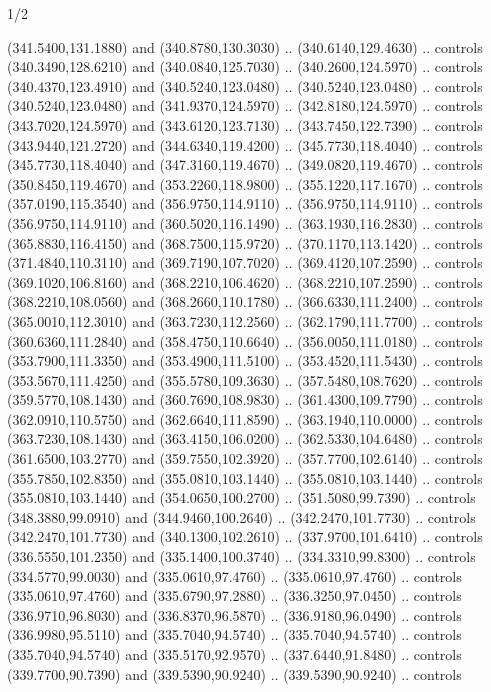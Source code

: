 \begin{flagdescription}{1/2}
\begin{scope}[xshift=0.5\flaglength]
\begin{scope}[scale=0.004\flagwidth,xshift=-90mm,yshift=89mm]
\begin{scope}[y=0.80pt, x=0.80pt, yscale=-1, xscale=1, inner sep=0pt, outer sep=0pt]
  (341.5400,131.1880) and (340.8780,130.3030) .. (340.6140,129.4630) .. controls
  (340.3490,128.6210) and (340.0840,125.7030) .. (340.2600,124.5970) .. controls
  (340.4370,123.4910) and (340.5240,123.0480) .. (340.5240,123.0480) .. controls
  (340.5240,123.0480) and (341.9370,124.5970) .. (342.8180,124.5970) .. controls
  (343.7020,124.5970) and (343.6120,123.7130) .. (343.7450,122.7390) .. controls
  (343.9440,121.2720) and (344.6340,119.4200) .. (345.7730,118.4040) .. controls
  (345.7730,118.4040) and (347.3160,119.4670) .. (349.0820,119.4670) .. controls
  (350.8450,119.4670) and (353.2260,118.9800) .. (355.1220,117.1670) .. controls
  (357.0190,115.3540) and (356.9750,114.9110) .. (356.9750,114.9110) .. controls
  (356.9750,114.9110) and (360.5020,116.1490) .. (363.1930,116.2830) .. controls
  (365.8830,116.4150) and (368.7500,115.9720) .. (370.1170,113.1420) .. controls
  (371.4840,110.3110) and (369.7190,107.7020) .. (369.4120,107.2590) .. controls
  (369.1020,106.8160) and (368.2210,106.4620) .. (368.2210,107.2590) .. controls
  (368.2210,108.0560) and (368.2660,110.1780) .. (366.6330,111.2400) .. controls
  (365.0010,112.3010) and (363.7230,112.2560) .. (362.1790,111.7700) .. controls
  (360.6360,111.2840) and (358.4750,110.6640) .. (356.0050,111.0180) .. controls
  (353.7900,111.3350) and (353.4900,111.5100) .. (353.4520,111.5430) .. controls
  (353.5670,111.4250) and (355.5780,109.3630) .. (357.5480,108.7620) .. controls
  (359.5770,108.1430) and (360.7690,108.9830) .. (361.4300,109.7790) .. controls
  (362.0910,110.5750) and (362.6640,111.8590) .. (363.1940,110.0000) .. controls
  (363.7230,108.1430) and (363.4150,106.0200) .. (362.5330,104.6480) .. controls
  (361.6500,103.2770) and (359.7550,102.3920) .. (357.7700,102.6140) .. controls
  (355.7850,102.8350) and (355.0810,103.1440) .. (355.0810,103.1440) .. controls
  (355.0810,103.1440) and (354.0650,100.2700) .. (351.5080,99.7390) .. controls
  (348.3880,99.0910) and (344.9460,100.2640) .. (342.2470,101.7730) .. controls
  (342.2470,101.7730) and (340.1300,102.2610) .. (337.9700,101.6410) .. controls
  (336.5550,101.2350) and (335.1400,100.3740) .. (334.3310,99.8300) .. controls
  (334.5770,99.0030) and (335.0610,97.4760) .. (335.0610,97.4760) .. controls
  (335.0610,97.4760) and (335.6790,97.2880) .. (336.3250,97.0450) .. controls
  (336.9710,96.8030) and (336.8370,96.5870) .. (336.9180,96.0490) .. controls
  (336.9980,95.5110) and (335.7040,94.5740) .. (335.7040,94.5740) .. controls
  (335.7040,94.5740) and (335.5170,92.9570) .. (337.6440,91.8480) .. controls
  (339.7700,90.7390) and (339.5390,90.9240) .. (339.5390,90.9240) .. controls

\end{scope}
\end{scope}
\end{scope}
\end{flagdescription}
